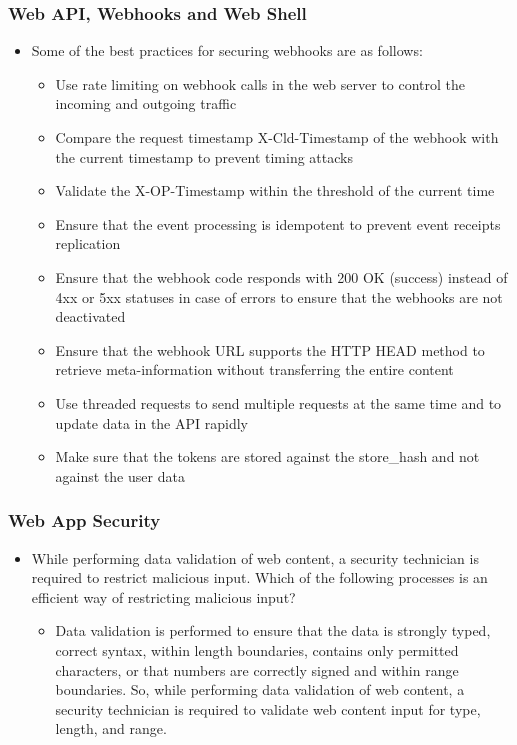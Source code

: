 \subsubsection{Web API, Webhooks and Web Shell}
\begin{itemize}
    \item Some of the best practices for securing webhooks are as follows:
    \begin{itemize}
        \item Use rate limiting on webhook calls in the web server to control the incoming and outgoing traffic
        \item Compare the request timestamp X-Cld-Timestamp of the webhook with the current timestamp to prevent timing attacks
        \item Validate the X-OP-Timestamp within the threshold of the current time
        \item Ensure that the event processing is idempotent to prevent event receipts replication
        \item Ensure that the webhook code responds with 200 OK (success) instead of 4xx or 5xx statuses in case of errors to ensure that the webhooks are not deactivated
        \item Ensure that the webhook URL supports the HTTP HEAD method to retrieve meta-information without transferring the entire content
        \item Use threaded requests to send multiple requests at the same time and to update data in the API rapidly
        \item Make sure that the tokens are stored against the store\_hash and not against the user data
    \end{itemize}
\end{itemize}
\subsubsection{Web App Security}
\begin{itemize}
    \item While performing data validation of web content, a security technician is required to restrict malicious input. Which of the following processes is an efficient way of restricting malicious input?
    \begin{itemize}
        \item Data validation is performed to ensure that the data is strongly typed, correct syntax, within length boundaries, contains only permitted characters, or that numbers are correctly signed and within range boundaries. So, while performing data validation of web content, a security technician is required to validate web content input for type, length, and range.
    \end{itemize}
\end{itemize}


